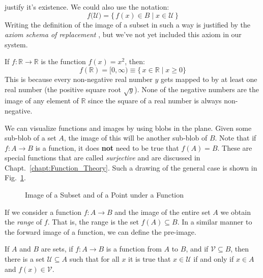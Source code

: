         justify it's existence. We could also use the notation:
        \begin{equation}
            f\big(\mathcal{U})=\{\,f(x)\in{B}\;|\;x\in\mathcal{U}\,\}
        \end{equation}
        Writing the definition of the image of a subset in such a way is
        justified by the \textit{axiom schema of replacement}%
        , but we've not yet included this
        axiom in our system.
        \begin{example}
            If $f:\mathbb{R}\rightarrow\mathbb{R}$ is the function $f(x)=x^{2}$,
            then:
            \begin{equation}
                f(\mathbb{R})=[0,\infty)\equiv\{\,x\in\mathbb{R}\;|\;x\geq{0}\}
            \end{equation}
            This is because every non-negative real number $y$ gets mapped to
            by at least one real number (the positive square root $\sqrt{y}$).
            None of the negative numbers are the image of any element of
            $\mathbb{R}$ since the square of a real number is always
            non-negative.
        \end{example}
        We can visualize functions and images by using blobs in the plane. Given
        some sub-blob of a set $A$, the image of this will be another sub-blob
        of $B$. Note that if $f:A\rightarrow{B}$ is a function, it does
        \textbf{not} need to be true that $f(A)=B$. These are special functions
        that are called \textit{surjective} and are
        discussed in Chapt.~\ref{chapt:Function_Theory}. Such a drawing of the
        general case is shown in Fig.~\ref{fig:Image_of_Point_and_Subset}.
        \begin{figure}[H]
            \centering
            \captionsetup{type=figure}
            
            \caption{Image of a Subset and of a Point under a Function}
            \label{fig:Image_of_Point_and_Subset}
        \end{figure}
        If we consider a function $f:A\rightarrow{B}$ and the image of the
        entire set $A$ we obtain the \textit{range} of $f$. That is, the range
        is the set $f(A)\subseteq{B}$. In a similar manner to the forward image
        of a function, we can define the pre-image.
        \begin{theorem}
            \label{thm:Existence_of_Pre_Image}%
            If $A$ and $B$ are sets, if $f:A\rightarrow{B}$ is a function from
            $A$ to $B$, and if $\mathcal{V}\subseteq{B}$, then there is a set
            $\mathcal{U}\subseteq{A}$ such that for all $x$ it is true that
            $x\in\mathcal{U}$ if and only if $x\in{A}$ and $f(x)\in\mathcal{V}$.
        \end{theorem}
